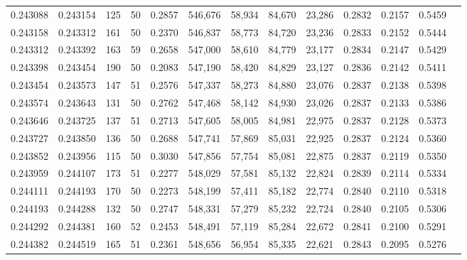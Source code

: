 \begin{tabular}{rrrrrrrrrrrrr}
0.243088 & 0.243154 &   125 &  50 &                                     0.2857 & 546,676 &  58,934 &  84,670 &  23,286 & 0.2832 & 0.2157 & 0.5459 \\
0.243158 & 0.243312 &   161 &  50 &                                     0.2370 & 546,837 &  58,773 &  84,720 &  23,236 & 0.2833 & 0.2152 & 0.5444 \\
0.243312 & 0.243392 &   163 &  59 &                                     0.2658 & 547,000 &  58,610 &  84,779 &  23,177 & 0.2834 & 0.2147 & 0.5429 \\
0.243398 & 0.243454 &   190 &  50 &                                     0.2083 & 547,190 &  58,420 &  84,829 &  23,127 & 0.2836 & 0.2142 & 0.5411 \\
0.243454 & 0.243573 &   147 &  51 &                                     0.2576 & 547,337 &  58,273 &  84,880 &  23,076 & 0.2837 & 0.2138 & 0.5398 \\
0.243574 & 0.243643 &   131 &  50 &                                     0.2762 & 547,468 &  58,142 &  84,930 &  23,026 & 0.2837 & 0.2133 & 0.5386 \\
0.243646 & 0.243725 &   137 &  51 &                                     0.2713 & 547,605 &  58,005 &  84,981 &  22,975 & 0.2837 & 0.2128 & 0.5373 \\
0.243727 & 0.243850 &   136 &  50 &                                     0.2688 & 547,741 &  57,869 &  85,031 &  22,925 & 0.2837 & 0.2124 & 0.5360 \\
0.243852 & 0.243956 &   115 &  50 &                                     0.3030 & 547,856 &  57,754 &  85,081 &  22,875 & 0.2837 & 0.2119 & 0.5350 \\
0.243959 & 0.244107 &   173 &  51 &                                     0.2277 & 548,029 &  57,581 &  85,132 &  22,824 & 0.2839 & 0.2114 & 0.5334 \\
0.244111 & 0.244193 &   170 &  50 &                                     0.2273 & 548,199 &  57,411 &  85,182 &  22,774 & 0.2840 & 0.2110 & 0.5318 \\
0.244193 & 0.244288 &   132 &  50 &                                     0.2747 & 548,331 &  57,279 &  85,232 &  22,724 & 0.2840 & 0.2105 & 0.5306 \\
0.244292 & 0.244381 &   160 &  52 &                                     0.2453 & 548,491 &  57,119 &  85,284 &  22,672 & 0.2841 & 0.2100 & 0.5291 \\
0.244382 & 0.244519 &   165 &  51 &                                     0.2361 & 548,656 &  56,954 &  85,335 &  22,621 & 0.2843 & 0.2095 & 0.5276 \\

\end{tabular}
